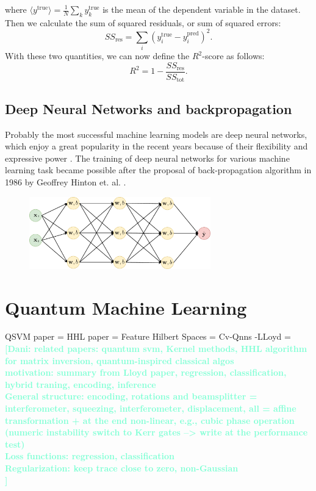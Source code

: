 \documentclass[12pt, a4paper,  nobibnotes]{article}
\newcommand{\nd}[1]{\textcolor{Aquamarine}{\textbf{[Dani: #1]}}}
\begin{document}
where $\langle y^{\textrm{true}} \rangle =\frac{1}{N} \sum\limits_{k}y_k^{\textrm{true}}$ is the
mean of the dependent variable in the dataset. Then we calculate the sum of squared residuals,
or sum of squared errors:
\begin{equation}
    SS_{\textrm{res}} = \sum\limits_{i}(y^{\textrm{true}}_i-y^{\textrm{pred}}_i)^2.
\end{equation}
With these two quantities, we can now define the $R^2$-score as follows:
\begin{equation}
    R^2 = 1-\frac{SS_{\textrm{res}}}{SS_{\textrm{tot}}}.
\end{equation}

\subsection{Deep Neural Networks and backpropagation}
Probably the most successful machine learning models are deep neural networks, which enjoy a great 
popularity in the recent years because of their flexibility and expressive power \cite{LeCun2015DeepLearning}.
The training of deep neural networks for various machine learning task
became possible after the proposal of back-propagation algorithm in 1986 by 
Geoffrey Hinton et. al. \cite{BackpropPaper}.


\begin{figure}[H]
    \centering
    \includegraphics[width=0.7\textwidth]{figures/MLP.pdf}
\end{figure}
\section{Quantum Machine Learning}
QSVM paper = \cite{QSVMPaper}
HHL paper = \cite{HHLPaper}
Feature Hilbert Spaces = \cite{FeatureHilbertSpaces}
Cv-Qnns -LLoyd = \cite{CVQNNLLoyd}
\nd{related papers: quantum svm, Kernel methods, HHL algorithm for matrix inversion, quantum-inspired classical algos\\
motivation: summary from Lloyd paper, regression, classification, hybrid traning, encoding, inference\\
General structure: encoding, rotations and beamsplitter = interferometer, squeezing, interferometer, displacement, all = affine transformation + at the end non-linear, e.g., cubic phase operation (numeric instability switch to Kerr gates --> write at the performance test)  \\
Loss functions: regression, classification\\
Regularization: keep trace close to zero, non-Gaussian\\
}
\end{document}
